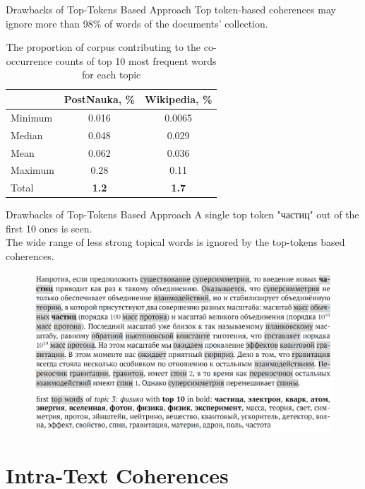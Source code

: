 \documentclass[russian]{beamer}
\begin{document}
\begin{frame}{Drawbacks of Top-Tokens Based Approach}
  Top token-based coherences may ignore more than 98\% of words of the documents' collection.
  
  \bigskip
  
  \begin{table}[h]
    \centering
    \captionsetup{justification=centering}
    
    \begin{tabular}{lcc}
      {} & PostNauka, \% & Wikipedia, \%\\
      \midrule
      Minimum & 0.016 & 0.0065\\
      Median & 0.048 & 0.029\\
      Mean & 0.062 & 0.036\\
      Maximum & 0.28 & 0.11\\
      \midrule
      Total & \textbf{1.2} & \textbf{1.7}
    \end{tabular}
    
    \caption*{The proportion of corpus contributing to the co-occurrence counts of top 10 most frequent words for each topic}
  \end{table}
\end{frame}


\begin{frame}{Drawbacks of Top-Tokens Based Approach}
  A single top token "частиц" out of the first 10 ones is seen.\\
  The wide range of less strong topical words is ignored by the top-tokens based coherences.
  \begin{figure}[h]
    \centering
    \includegraphics[width=1.0\textwidth]{topwords-insufficient.jpg}
  \end{figure}
\end{frame}


\section{Intra-Text Coherences}
\end{document}
